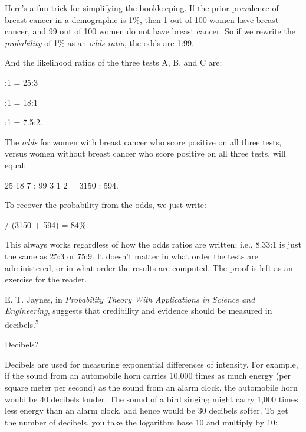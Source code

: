 {
 Here's a fun trick for simplifying the
bookkeeping. If the prior prevalence of breast cancer in a demographic
is 1\%, then 1 out of 100 women have breast cancer, and 99 out of 100
women do not have breast cancer. So if we rewrite the
\textit{probability} of 1\% as an \textit{odds ratio}, the odds are
1:99.}

{
 And the likelihood ratios of the three tests A, B, and C are:}

{:1 = 25:3
\par}


\bigskip

{:1 = 18:1
\par}


\bigskip

{:1 = 7.5:2.
\par}


\bigskip

{
 The \textit{odds} for women with breast cancer who score positive
on all three tests, versus women without breast cancer who score
positive on all three tests, will equal:}

{ {\texttimes} 25 {\texttimes} 18 {\texttimes} 7 : 99 {\texttimes}
3 {\texttimes} 1 {\texttimes} 2 = 3150 : 594.
\par}


\bigskip

{
 To recover the probability from the odds, we just write:}

{ / (3150 + 594) = 84\%.
\par}


\bigskip

{
 This always works regardless of how the odds ratios are written;
i.e., 8.33:1 is just the same as 25:3 or 75:9. It
doesn't matter in what order the tests are
administered, or in what order the results are computed. The proof is
left as an exercise for the reader.}

{
 E. T. Jaynes, in \textit{Probability Theory With Applications in
Science and Engineering}, suggests that credibility and evidence should
be measured in decibels.\textsuperscript{5}}

{
 Decibels?}

{
 Decibels are used for measuring exponential differences of
intensity. For example, if the sound from an automobile horn carries
10,000 times as much energy (per square meter per second) as the sound
from an alarm clock, the automobile horn would be 40 decibels louder.
The sound of a bird singing might carry 1,000 times less energy than an
alarm clock, and hence would be 30 decibels softer. To get the number
of decibels, you take the logarithm base 10 and multiply by 10:}

